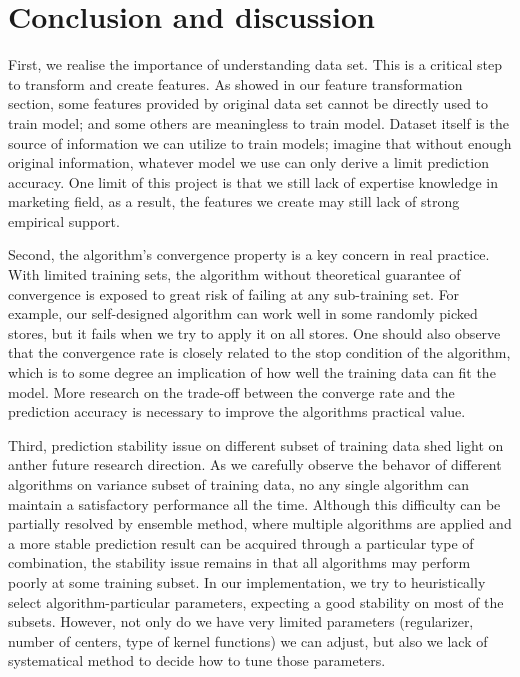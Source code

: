 \documentclass[11pt]{article}
\begin{document}
\section{Conclusion and discussion}

First, we realise the importance of understanding data set. This is a critical step to transform and create features. As showed in our feature transformation section, some features provided by original data set cannot be directly used to train model; and some others are meaningless to train model. Dataset itself is the source of information we can utilize to train models; imagine that without enough original information, whatever model we use can only derive a limit prediction accuracy. One limit of this project is that we still lack of expertise knowledge in marketing field, as a result, the features we create may still lack of strong empirical support. 

Second, the algorithm's convergence property is a key concern in real practice. With limited training sets, the algorithm without theoretical guarantee of convergence is exposed to great risk of failing at any sub-training set. For example, our self-designed algorithm can work well in some randomly picked stores, but it fails when we try to apply it on all stores. One should also observe that the convergence rate is closely related to the stop condition of the algorithm, which is to some degree an implication of how well the training data can fit the model. More research on the trade-off between the converge rate and the prediction accuracy is necessary to improve the algorithms practical value.

Third, prediction stability issue on different subset of training data shed light on anther future research direction. As we carefully observe the behavor of different algorithms on variance subset of training data, no any single algorithm can maintain a satisfactory performance all the time. Although this difficulty can be partially resolved by ensemble method, where multiple algorithms are applied and a more stable prediction result can be acquired through a particular type of combination, the stability issue remains in that all algorithms may perform poorly at some training subset. In our implementation, we try to heuristically select algorithm-particular parameters, expecting a good stability on most of the subsets. However, not only do we have very limited parameters (regularizer, number of centers, type of kernel functions) we can adjust, but also we lack of systematical method to decide how to tune those parameters. 
\end{document}
